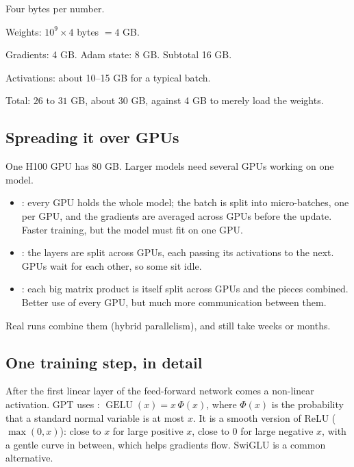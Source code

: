 \begin{example}
Four bytes per number.
\begin{steps}
  \item Weights: $10^9 \times 4$ bytes $= 4$ GB.
  \item Gradients: 4 GB. Adam state: 8 GB. Subtotal 16 GB.
  \item Activations: about 10--15 GB for a typical batch.
  \item Total: $26$ to $31$ GB, about 30 GB, against 4 GB to merely load the weights.
\end{steps}
\end{example}

\subsection*{Spreading it over GPUs}

\begin{definition}
One H100 GPU has 80 GB. Larger models need several GPUs working on one model.
\begin{itemize}
  \item {}: every GPU holds the whole model; the batch is split into micro-batches, one per GPU, and the gradients are averaged across GPUs before the update. Faster training, but the model must fit on one GPU.
  \item {}: the layers are split across GPUs, each passing its activations to the next. GPUs wait for each other, so some sit idle.
  \item {}: each big matrix product is itself split across GPUs and the pieces combined. Better use of every GPU, but much more communication between them.
\end{itemize}
Real runs combine them (hybrid parallelism), and still take weeks or months.
\end{definition}

\subsection*{One training step, in detail}

\begin{definition}[GELU]
After the first linear layer of the feed-forward network comes a non-linear activation. GPT uses : $\operatorname{GELU}(x) = x\,\Phi(x)$, where $\Phi(x)$ is the probability that a standard normal variable is at most $x$. It is a smooth version of ReLU ($\max(0, x)$): close to $x$ for large positive $x$, close to 0 for large negative $x$, with a gentle curve in between, which helps gradients flow. SwiGLU is a common alternative.
\end{definition}


